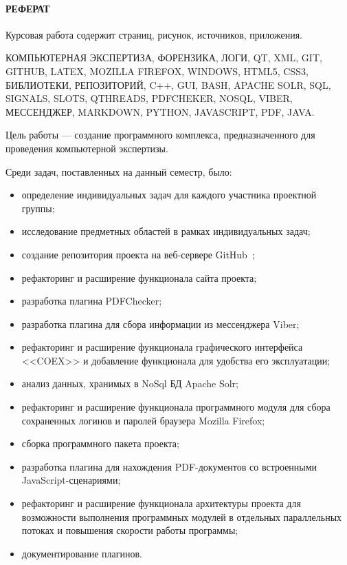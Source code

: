 \newpage
{}
\paragraph{\hfill РЕФЕРАТ \hfill}
Курсовая работа содержит  страниц,  рисунок,  источников,  приложения.

КОМПЬЮТЕРНАЯ ЭКСПЕРТИЗА, ФОРЕНЗИКА, ЛОГИ, QT, XML, GIT, GITHUB, LATEX, MOZILLA FIREFOX, WINDOWS, HTML5, CSS3, БИБЛИОТЕКИ, РЕПОЗИТОРИЙ, C++, GUI, BASH, APACHE SOLR, SQL, SIGNALS, SLOTS, QTHREADS, PDFCHEKER, NOSQL, VIBER, МЕССЕНДЖЕР, MARKDOWN, PYTHON, JAVASCRIPT, PDF, JAVA. 

Цель работы --- создание программного комплекса, предназначенного для проведения компьютерной экспертизы.

Среди задач, поставленных на данный семестр, было: 
\begin{itemize}
  \item определение индивидуальных задач для каждого участника проектной группы;
  \item исследование предметных областей в рамках индивидуальных задач; 
  \item создание репозитория проекта на веб-сервере GitHub~\cite{github};
  \item рефакторинг и расширение функционала сайта проекта;
  \item разработка плагина PDFChecker;
  \item разработка плагина для сбора информации из мессенджера Viber;
  \item рефакторинг и расширение функционала графического интерфейса <<COEX>> и добавление функционала для удобства его эксплуатации;
  \item анализ данных, хранимых в NoSql БД Apache Solr;
  \item рефакторинг и расширение функционала программного модуля для сбора сохраненных логинов и паролей браузера Mozilla Firefox;
  \item сборка программного пакета проекта;  
  \item разработка плагина для нахождения PDF-документов со встроенными JavaScript-сценариями;
  \item рефакторинг и расширение функционала архитектуры проекта для возможности выполнения программных модулей в отдельных параллельных потоках и повышения скорости работы программы;
  \item документирование плагинов.
\end{itemize}

